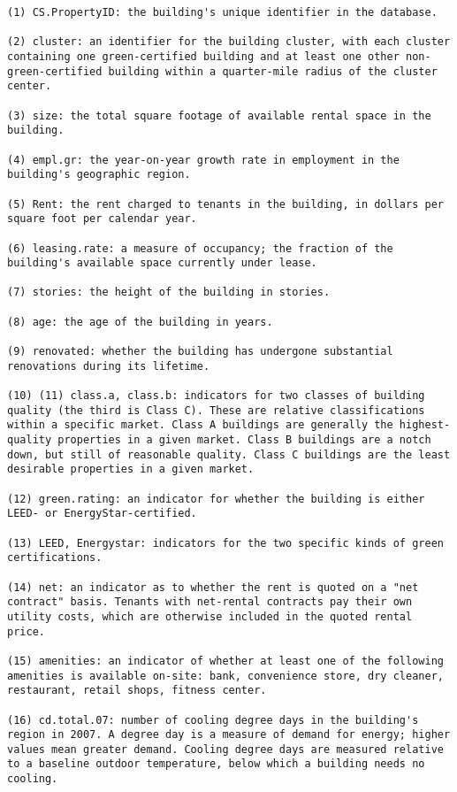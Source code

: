 \documentclass[
]{article}
\begin{document}
\begin{verbatim}
(1) CS.PropertyID: the building's unique identifier in the database.

(2) cluster: an identifier for the building cluster, with each cluster containing one green-certified building and at least one other non-green-certified building within a quarter-mile radius of the cluster center.

(3) size: the total square footage of available rental space in the building.

(4) empl.gr: the year-on-year growth rate in employment in the building's geographic region.

(5) Rent: the rent charged to tenants in the building, in dollars per square foot per calendar year.

(6) leasing.rate: a measure of occupancy; the fraction of the building's available space currently under lease.

(7) stories: the height of the building in stories.

(8) age: the age of the building in years.

(9) renovated: whether the building has undergone substantial renovations during its lifetime.

(10) (11) class.a, class.b: indicators for two classes of building quality (the third is Class C). These are relative classifications within a specific market. Class A buildings are generally the highest-quality properties in a given market. Class B buildings are a notch down, but still of reasonable quality. Class C buildings are the least desirable properties in a given market.

(12) green.rating: an indicator for whether the building is either LEED- or EnergyStar-certified.

(13) LEED, Energystar: indicators for the two specific kinds of green certifications.

(14) net: an indicator as to whether the rent is quoted on a "net contract" basis. Tenants with net-rental contracts pay their own utility costs, which are otherwise included in the quoted rental price.

(15) amenities: an indicator of whether at least one of the following amenities is available on-site: bank, convenience store, dry cleaner, restaurant, retail shops, fitness center.

(16) cd.total.07: number of cooling degree days in the building's region in 2007. A degree day is a measure of demand for energy; higher values mean greater demand. Cooling degree days are measured relative to a baseline outdoor temperature, below which a building needs no cooling.


\end{verbatim}
\end{document}
